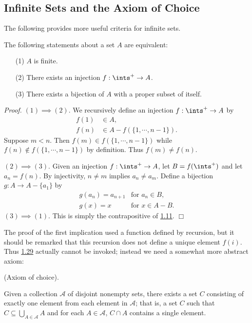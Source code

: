 \subsection{Infinite Sets and the Axiom of Choice}
The following provides more useful criteria for infinite sets.
\begin{theorem}\label{1.30}
    The following statements about a set $A$ are equivalent:
    \begin{enumerate}
        \item[(1)] $A$ is finite.
        \item[(2)] There exists an injection $f: \ints^+ \rightarrow A$.
        \item[(3)] There exists a bijection of $A$ with a proper subset of itself.
    \end{enumerate}
\end{theorem}
{\it Proof.}
$(1) \implies (2)$. We recursively define an injection $f: \ints^+ \rightarrow A$ by
\begin{align*}
    f(1) &\in A, \\
    f(n) &\in A- f(\{1, \cdots , n-1\}).
\end{align*}
Suppose $m< n$. Then $f(m) \in f(\{1, \cdots, n-1\})$ while $f(n) \notin f(\{1, \cdots, n-1\})$ by definition. Thus $f(m) \neq f(n)$.

$(2) \implies (3).$ Given an injection $f: \ints^+ \rightarrow A$, let $B = f(\ints^+)$ and let $a_n = f(n)$. By injectivity, $n \neq m$ implies $a_n \neq a_m$. Define a bijection $g: A \rightarrow A - \{a_1\}$ by
\begin{align*}
    g(a_n) = a_{n+1} &\text{for } a_n \in B, \\
    g(x) = x &\text{for } x \in A - B.
\end{align*}
$(3) \implies (1).$ This is simply the contrapositive of \hyperref[1.11]{1.11}. $\Box$

The proof of the first implication used a function defined by recursion, but it should be remarked that this recursion does not define a unique element $f(i).$ Thus \hyperref[1.29]{1.29} actually cannot be invoked; instead we need a somewhat more abstract axiom:
\begin{definition}\label{1.31}
    (Axiom of choice).
    \vspace{10pt}

    Given a collection $\mathcal{A}$ of disjoint nonempty sets, there exists a set $C$ consisting of exactly one element from each element in $\mathcal{A}$; that is, a set $C$ such that $C \subseteq \bigcup_{A \in \mathcal{A}} A$ and for each $A \in \mathcal{A}$, $C \cap A$ contains a single element.
\end{definition}

